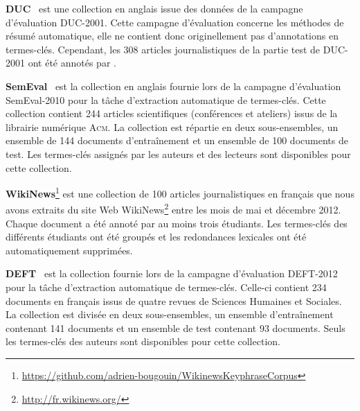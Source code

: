     \textbf{DUC}~\citep{over2001duc} est une collection en anglais issue des
    données de la campagne d'évaluation DUC-2001. Cette campagne d'évaluation
    concerne les méthodes de résumé automatique, elle ne contient donc
    originellement pas d'annotations en termes-clés. Cependant, les 308 articles
    journalistiques de la partie test de DUC-2001 ont été annotés par
    \cite{wan2008expandrank}.

    \textbf{SemEval}~\citep{kim2010semeval} est la collection en anglais fournie
    lors de la campagne d'évaluation SemEval-2010 pour la tâche d'extraction
    automatique de termes-clés. Cette collection contient 244 articles
    scientifiques (conférences et ateliers) issus de la librairie numérique
    \textsc{Acm}. La collection est répartie en deux sous-ensembles, un ensemble
    de 144 documents d'entraînement et un ensemble de 100 documents de test. Les
    termes-clés assignés par les auteurs et des lecteurs sont disponibles pour
    cette collection.

    \textbf{WikiNews}\footnote{\url{https://github.com/adrien-bougouin/WikinewsKeyphraseCorpus}}
    est une collection de 100 articles journalistiques en français que nous
    avons extraits du site Web WikiNews\footnote{\url{http://fr.wikinews.org/}}
    entre les mois de mai et décembre 2012. Chaque document a été annoté par au
    moins trois étudiants. Les termes-clés des différents étudiants ont été
    groupés et les redondances lexicales ont été automatiquement supprimées.

    \textbf{DEFT}~\citep{paroubek2012deft} est la collection fournie lors de la
    campagne d'évaluation DEFT-2012 pour la tâche d'extraction automatique de
    termes-clés. Celle-ci contient 234 documents en français issus de quatre
    revues de Sciences Humaines et Sociales. La collection est divisée en deux
    sous-ensembles, un ensemble d'entraînement contenant 141 documents et un
    ensemble de test contenant 93 documents.  Seuls les termes-clés des auteurs
    sont disponibles pour cette collection.

